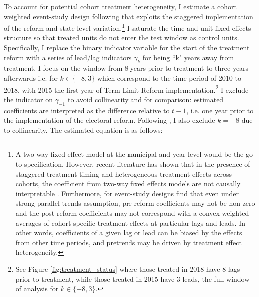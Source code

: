 \documentclass[12pt]{amsart}
\numberwithin{equation}{section}
\theoremstyle{definition}
\theoremstyle{definition}
\theoremstyle{definition}
\begin{document}
 To account for potential cohort treatment heterogeneity, I estimate  a cohort weighted event-study design following \citet{abraham_sun_2020} that exploits the staggered implementation of the reform and state-level variation.\footnote{A two-way fixed effect model at the municipal and year level would be the go to specification. However, recent literature has shown that in the presence of staggered treatment timing and heterogeneous treatment effects across cohorts, the coefficient from two-way fixed effects models are not causally interpretable \citep{goodman_bacon_2018, callaway_santana_2019, strezhnev_2018, chaisemarting_etal_2019}. Furthermore, for event-study designs \citet{abraham_sun_2020} find that even under strong parallel trends assumption, pre-reform coefficients may not be non-zero and the post-reform coefficients may not correspond with a convex weighted averages of cohort-specific treatment effects at particular lags and leads. In other words, coefficients of a given lag or lead can be biased by the effects from other time periods, and pretrends may be driven by treatment effect heterogeneity.}  
 I saturate the time and unit fixed effects structure so that treated units do not enter the test window as control units. Specifically, I replace the binary indicator variable for the start of the treatment reform with a series of lead/lag indicators $\gamma_k$ for being ``k" years away from treatment. I focus on the window from 8 years prior to treatment to three years afterwards i.e. for $k \in \{-8,3\} $ which correspond to the time period of 2010 to 2018, with 2015 the first year of Term Limit Reform implementation.\footnote{See Figure \ref{fig:treatment_status} where those treated in 2018 have 8 lags prior to treatment, while those treated in 2015 have 3 leads, the full window of analysis for $k \in \{-8,3\} $.} %
I exclude the indicator on $\gamma_{-1}$ to avoid collinearity and for comparison: estimated coefficients are interpreted as the difference relative to $t-1$, i.e. one year prior to the implementation of the electoral reform. Following   \citet{abraham_sun_2020}, I also exclude $k=-8$ due to collinearity. The estimated equation is as follows:
\end{document}
